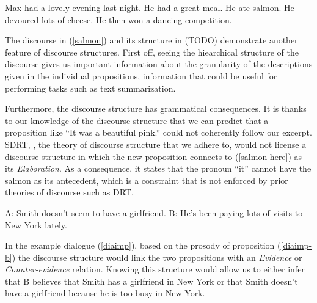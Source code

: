 \documentclass{article}
\begin{document}
\begin{exe}
  \ex \label{salmon} \begin{xlist}
    \ex Max had a lovely evening last night.
    \ex He had a great meal.
    \ex \label{salmon-here} He ate salmon.
    \ex He devoured lots of cheese.
    \ex He then won a dancing competition.
  \end{xlist}
\end{exe}


The discourse in (\ref{salmon}) and its structure in (TODO) demonstrate
another feature of discourse structures. First off, seeing the
hiearchical structure of the discourse gives us important information
about the granularity of the descriptions given in the individual
propositions, information that could be useful for performing tasks such
as text summarization.

Furthermore, the discourse structure has grammatical consequences. It is
thanks to our knowledge of the discourse structure that we can predict
that a proposition like ``It was a beautiful pink.''  could not
coherently follow our excerpt. SDRT, \cite{asher2003logics}, the theory
of discourse structure that we adhere to, would not license a discourse
structure in which the new proposition connects to (\ref{salmon-here})
as its \emph{Elaboration}. As a consequence, it states that the pronoun
``it'' cannot have the salmon as its antecedent, which is a constraint
that is not enforced by prior theories of discourse such as DRT.

\begin{exe}
  \ex \label{diaimp} \begin{xlist}
    \ex A: Smith doesn't seem to have a girlfriend.
    \ex \label{diaimp-b} B: He's been paying lots of visits to New York lately.
  \end{xlist}
\end{exe}

In the example dialogue (\ref{diaimp}), based on the prosody of
proposition (\ref{diaimp-b}) the discourse structure would link the two
propositions with an \emph{Evidence} or \emph{Counter-evidence}
relation. Knowing this structure would allow us to either infer that B
believes that Smith has a girlfriend in New York or that Smith doesn't
have a girlfriend because he is too busy in New York.
\end{document}
